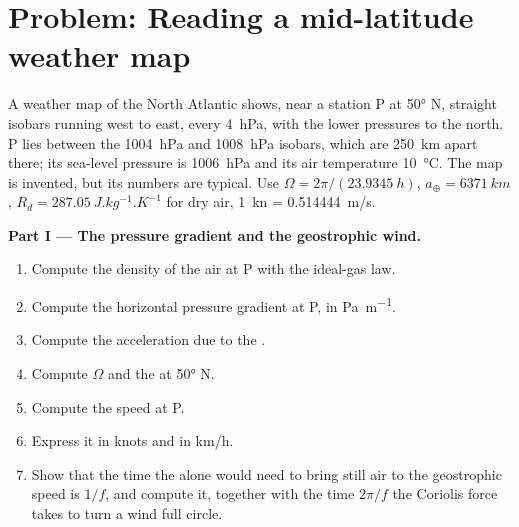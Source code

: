 \section{Problem: Reading a mid-latitude weather map}

\begin{problem}
\label{pb:b1:atmospheric-circulation:1}
A weather map of the North Atlantic shows, near a station P at \ang{50} N, straight
isobars running west to east, every \qty{4}{hPa}, with the lower pressures to the
north. P lies between the \qty{1004}{hPa} and \qty{1008}{hPa} isobars, which are
\qty{250}{km} apart there; its sea-level pressure is \qty{1006}{hPa} and its air
temperature \qty{10}{\degreeCelsius}. The map is invented, but its numbers are typical.
Use $\Omega = 2\pi/(\qty{23.9345}{h})$, $a_\oplus = \qty{6371}{km}$, $R_d =
\qty{287.05}{J.kg^{-1}.K^{-1}}$ for dry air, \qty{1}{kn} = \qty{0.514444}{m/s}.

\medskip
\noindent\textbf{Part I --- The pressure gradient and the geostrophic wind.}
\begin{enumerate}
  \item Compute the density of the air at P with the ideal-gas law.
  \item Compute the horizontal pressure gradient at P, in \unit{Pa.m^{-1}}.
  \item Compute the acceleration due to the .
  \item Compute $\Omega$ and the  at \ang{50} N.
  \item Compute the  speed at P.
  \item Express it in knots and in \unit{km/h}.
  \item Show that the time the  alone would need to bring
        still air to the geostrophic speed is $1/f$, and compute it, together with
        the time $2\pi/f$ the Coriolis force takes to turn a wind full circle.
\end{enumerate}


\end{problem}
